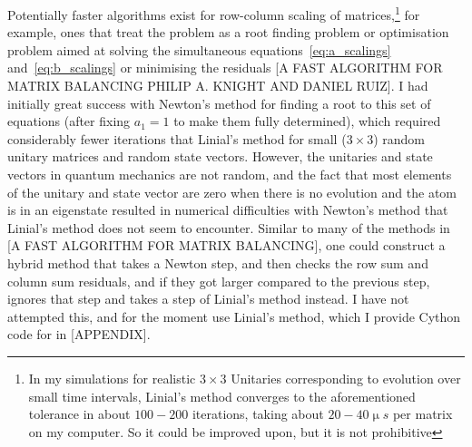 Potentially faster algorithms exist for row-column scaling of matrices,\footnote{In my simulations for realistic $3\times3$ Unitaries corresponding to evolution over small time intervals, Linial's method converges to the aforementioned tolerance in about $100-200$ iterations, taking about $20-40\unit{\upmu s}$ per matrix on my computer. So it could be improved upon, but it is not prohibitive} for example, ones that treat the problem as a root finding problem or optimisation problem aimed at solving the simultaneous equations~\eqref{eq:a_scalings} and~\eqref{eq:b_scalings} or minimising the residuals [A FAST ALGORITHM FOR MATRIX BALANCING PHILIP A. KNIGHT AND DANIEL RUIZ]. I had initially great success with Newton's method for finding a root to this set of equations (after fixing $a_1=1$ to make them fully determined), which required considerably fewer iterations that Linial's method for small ($3\times3$) random unitary matrices and random state vectors. However, the unitaries and state vectors in quantum mechanics are not random, and the fact that most elements of the unitary and state vector are zero when there is no evolution and the atom is in an eigenstate resulted in numerical difficulties with Newton's method that Linial's method does not seem to encounter. Similar to many of the methods in [A FAST ALGORITHM FOR MATRIX BALANCING], one could construct a hybrid method that takes a Newton step, and then checks the row sum and column sum residuals, and if they got larger compared to the previous step, ignores that step and takes a step of Linial's method instead. I have not attempted this, and for the moment use Linial's method, which I provide Cython code for in [APPENDIX].

